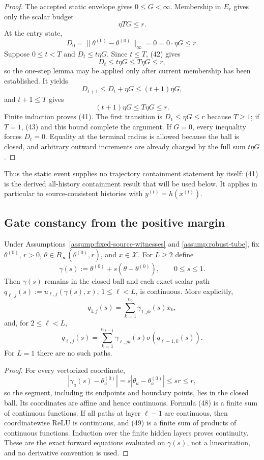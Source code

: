 \begin{proof}
The accepted static envelope gives $0\leq G<\infty$.  Membership in $E_r$
gives only the scalar budget
\[
\eta T G\leq r.
\tag{42}
\]
At the entry state,
\[
D_0=\|\theta^{(0)}-\theta^{(0)}\|_\infty=0=0\cdot\eta G\leq r.
\tag{43}
\]
Suppose $0\leq t<T$ and $D_t\leq t\eta G$.  Since $t\leq T$, (42) gives
\[
D_t\leq t\eta G\leq T\eta G\leq r,
\tag{44}
\]
so the one-step lemma may be applied only after current membership has been
established.  It yields
\[
D_{t+1}\leq D_t+\eta G\leq(t+1)\eta G,
\tag{45}
\]
and $t+1\leq T$ gives
\[
(t+1)\eta G\leq T\eta G\leq r.
\tag{46}
\]
Finite induction proves (41).  The first transition is
$D_1\leq\eta G\leq r$ because $T\geq1$; if $T=1$, (43) and this bound
complete the argument.  If $G=0$, every inequality forces $D_t=0$.  Equality
at the terminal radius is allowed because the ball is closed, and arbitrary
outward increments are already charged by the full sum $t\eta G$.
\end{proof}

Thus the static event supplies no trajectory containment statement by itself:
(41) is the derived all-history containment result that will be used below.  It applies in
particular to source-consistent histories with $y^{(t)}=h(x^{(t)})$.

\subsection{Gate constancy from the positive margin}
\label{app:step003-gates}

\begin{lemma}
\label{lem:p1-i3-step003-continuous-preactivation}
Under Assumptions~\ref{assump:fixed-source-witnesses} and
\ref{assump:robust-tube}, fix $\theta^{(0)}$, $r>0$,
$\theta\in B_\infty(\theta^{(0)},r)$, and $x\in\mathcal X$.  For $L\geq2$
define
\[
\gamma(s):=\theta^{(0)}+s(\theta-\theta^{(0)}),
\qquad0\leq s\leq1.
\tag{47}
\]
Then $\gamma(s)$ remains in the closed ball and each exact scalar path
$q_{\ell,j}(s):=u_{\ell,j}(\gamma(s),x)$, $1\leq\ell<L$, is continuous.
More explicitly,
\[
q_{1,j}(s)=\sum_{k=1}^{n_0}\gamma_{1,jk}(s)x_k,
\tag{48}
\]
and, for $2\leq\ell<L$,
\[
q_{\ell,j}(s)=\sum_{k=1}^{n_{\ell-1}}
\gamma_{\ell,jk}(s)\sigma(q_{\ell-1,k}(s)).
\tag{49}
\]
For $L=1$ there are no such paths.
\end{lemma}

\begin{proof}
For every vectorized coordinate,
\[
|\gamma_a(s)-\theta^{(0)}_a|
=s|\theta_a-\theta^{(0)}_a|\leq sr\leq r,
\tag{50}
\]
so the segment, including its endpoints and boundary points, lies in the
closed ball.  Its coordinates are affine and hence continuous.  Formula
(48) is a finite sum of continuous functions.  If all paths at layer
$\ell-1$ are continuous, then coordinatewise ReLU is continuous, and (49) is
a finite sum of products of continuous functions.  Induction over the finite
hidden layers proves continuity.  These are the exact forward equations
evaluated on $\gamma(s)$, not a linearization, and no derivative convention is
used.
\end{proof}

